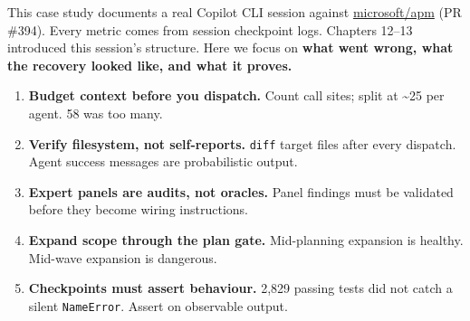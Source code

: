\documentclass[
  a4paper,
  DIV=11,
  numbers=noendperiod]{scrreprt}
\providecommand{\tightlist}{%
  \setlength{\itemsep}{0pt}\setlength{\parskip}{0pt}}
\begin{document}
\begin{tcolorbox}[enhanced jigsaw, arc=.35mm, bottomrule=.15mm, bottomtitle=1mm, breakable, colback=white, colbacktitle=quarto-callout-note-color!10!white, colframe=quarto-callout-note-color-frame, coltitle=black, left=2mm, leftrule=.75mm, opacityback=0, opacitybacktitle=0.6, rightrule=.15mm, title=\textcolor{quarto-callout-note-color}{\faInfo}\hspace{0.5em}{Note}, titlerule=0mm, toprule=.15mm, toptitle=1mm]

This case study documents a real Copilot CLI session against
\href{https://github.com/microsoft/apm}{microsoft/apm} (PR \#394). Every
metric comes from session checkpoint logs. Chapters 12--13 introduced
this session's structure. Here we focus on \textbf{what went wrong, what
the recovery looked like, and what it proves.}

\end{tcolorbox}

\begin{tcolorbox}[enhanced jigsaw, arc=.35mm, bottomrule=.15mm, bottomtitle=1mm, breakable, colback=white, colbacktitle=quarto-callout-tip-color!10!white, colframe=quarto-callout-tip-color-frame, coltitle=black, left=2mm, leftrule=.75mm, opacityback=0, opacitybacktitle=0.6, rightrule=.15mm, title=\textcolor{quarto-callout-tip-color}{\faLightbulb}\hspace{0.5em}{Five Lessons --- The TL;DR}, titlerule=0mm, toprule=.15mm, toptitle=1mm]

\begin{enumerate}
\def\labelenumi{\arabic{enumi}.}
\tightlist
\item
  \textbf{Budget context before you dispatch.} Count call sites; split
  at \textasciitilde25 per agent. 58 was too many.
\item
  \textbf{Verify filesystem, not self-reports.} \texttt{diff} target
  files after every dispatch. Agent success messages are probabilistic
  output.
\item
  \textbf{Expert panels are audits, not oracles.} Panel findings must be
  validated before they become wiring instructions.
\item
  \textbf{Expand scope through the plan gate.} Mid-planning expansion is
  healthy. Mid-wave expansion is dangerous.
\item
  \textbf{Checkpoints must assert behaviour.} 2,829 passing tests did
  not catch a silent \texttt{NameError}. Assert on observable output.
\end{enumerate}

\end{tcolorbox}
\end{document}
